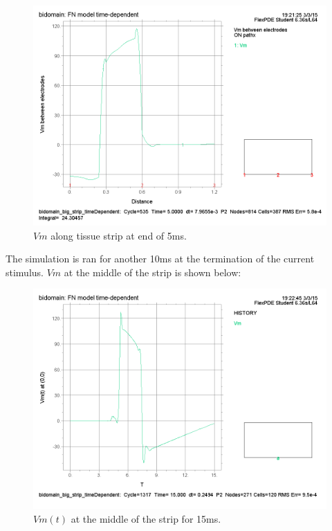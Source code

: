 \documentclass{article}
\begin{document}
\begin{figure}[H]
    \begin{center}
        \includegraphics[scale=0.5]{2Dstrip_VmAlongStrip_t=5ms.png}
        \caption{$Vm$ along tissue strip at end of 5ms.}
    \end{center}
\end{figure}

The simulation is ran for another 10ms at the termination of the current stimulus. $Vm$ at the middle of the strip is shown below:

\begin{figure}[H]
    \begin{center}
        \includegraphics[scale=0.5]{2Dstrip_VmOrigin_tmax=15ms.png}
        \caption{$Vm(t)$ at the middle of the strip for 15ms.}
    \end{center}
\end{figure}
\end{document}
